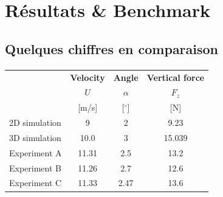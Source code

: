 \section{Résultats \& Benchmark}

\subsection{Quelques chiffres en comparaison}

\begin{frame}[fragile=singleslide]{\insertsectionhead}

  \framesubtitle{\insertsubsectionhead}
  \begin{table}
    \centering
    \begin{tabular}{@{} lccc @{}}
      \toprule
      & \textbf{Velocity} & \textbf{Angle}  & \textbf{Vertical force} \\
      & $U$ & $\alpha$  & $F_z$ \\
      & [m/s] & [$^\circ$]  & [N] \\
      \midrule
      2D simulation  & 9 & 2 & 9.23 \\
      3D simulation  & 10.0 & 3 & 15.039 \\
      Experiment A   & 11.31 & 2.5 & 13.2 \\
      Experiment B   & 11.26 & 2.7 & 12.6 \\
      Experiment C   & 11.33 & 2.47 & 13.6 \\
      \bottomrule
    \end{tabular}
  \end{table}
  \vspace{0.6cm}
  {\raggedleft\vfill\itshape{}\par}
\end{frame}

